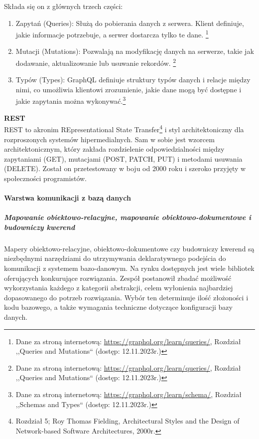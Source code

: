 \documentclass[12pt, a4paper, twoside, openany]{book}
\newcommand{\forceindent}{\leavevmode{\parindent=1.3em\indent}}
\begin{document}
Składa się on z głównych trzech części:
\begin{enumerate}
    \item Zapytań (Queries): Służą do pobierania danych z serwera. Klient definiuje, jakie informacje potrzebuje, a serwer dostarcza tylko te dane. \footnote{Dane za stroną internetową: \url{https://graphql.org/learn/queries/}, Rozdział ,,Queries and Mutations`` (dostęp: 12.11.2023r.)}
    \item Mutacji (Mutations): Pozwalają na modyfikację danych na serwerze, takie jak dodawanie, aktualizowanie lub usuwanie rekordów. \footnote{Dane za stroną internetową: \url{https://graphql.org/learn/queries/}, Rozdział ,,Queries and Mutations`` (dostęp: 12.11.2023r.)}
    \item Typów (Types): GraphQL definiuje struktury typów danych i relacje między nimi, co umożliwia klientowi zrozumienie, jakie dane mogą być dostępne i jakie zapytania można wykonywać.\footnote{Dane za stroną internetową: \url{https://graphql.org/learn/schema/}, Rozdział ,,Schemas and Types`` (dostęp: 12.11.2023r.)}
\end{enumerate}

\textbf{REST}\\
\forceindent REST to akronim REpresentational State Transfer\footnote{Rozdział 5; Roy Thomas Fielding, Architectural Styles and the Design of Network-based Software Architectures, 2000r.} i styl architektoniczny dla rozproszonych systemów hipermedialnych. Sam w sobie jest wzorcem architektonicznym, który zakłada rozdzielenie odpowiedzialności między zapytaniami (GET), mutacjami (POST, PATCH, PUT) i metodami usuwania (DELETE). Został on przetestowany w boju od 2000 roku i szeroko przyjęty w społeczności programistów.

\paragraph{Warstwa komunikacji z bazą danych}
\subparagraph{Mapowanie obiektowo-relacyjne, mapowanie obiektowo-dokumentowe i budowniczy kwerend\\}
\forceindent  Mapery obiektowo-relacyjne, obiektowo-dokumentowe czy budowniczy kwerend są niezbędnymi narzędziami do utrzymywania deklaratywnego podejścia do komunikacji z systemem bazo-danowym.
Na rynku dostępnych jest wiele bibliotek oferujących konkurujące rozwiązania.
Zespół postanowił zbadać możliwość wykorzystania każdego z kategorii abstrakcji, celem wyłonienia najbardziej dopasowanego do potrzeb rozwiązania.
Wybór ten determinuje ilość złożoności i kodu bazowego, a także wymagania techniczne dotyczące konfiguracji bazy danych.
\end{document}
